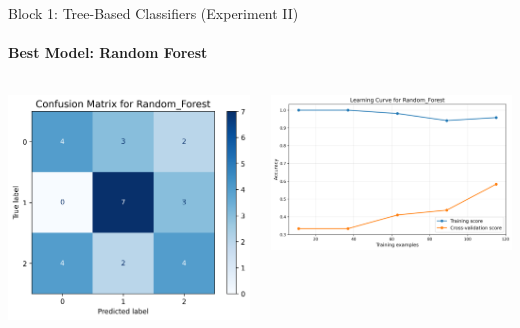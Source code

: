 \documentclass[9pt]{beamer}
\begin{document}
    \begin{frame}{Block 1: Tree-Based Classifiers (Experiment II)}
    \framesubtitle{Best Model: Random Forest}
    \begin{columns}
        \begin{column}{0.33\textwidth}
            \centering
            \includegraphics[width=\textwidth]{code/ResultsMainAugZip/plots/Block1_Tree_Based_Experiment_II/confusion_matrix_Random_Forest.png}
        \end{column}
        \begin{column}{0.33\textwidth}
            \centering
            \includegraphics[width=\textwidth]{code/ResultsMainAugZip/plots/Block1_Tree_Based_Experiment_II/learning_curve_Random_Forest.png}

\end{column}
\end{columns}
\end{frame}
\end{document}
